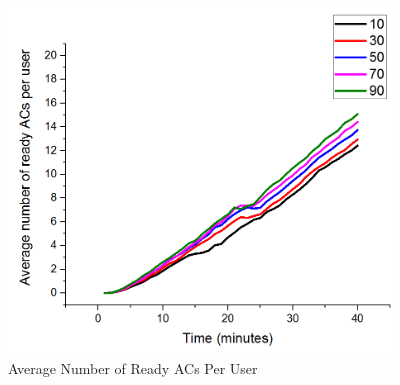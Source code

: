 \begin{figure} [hbtp]
\centering 
\includegraphics[width=4.0in]{figures/F421AverageNumberofReadyACsPerUser.png}
\caption{Average Number of Ready ACs Per User} 
\label{fig:F421AverageNumberofReadyACsPerUser} %
\end{figure}



